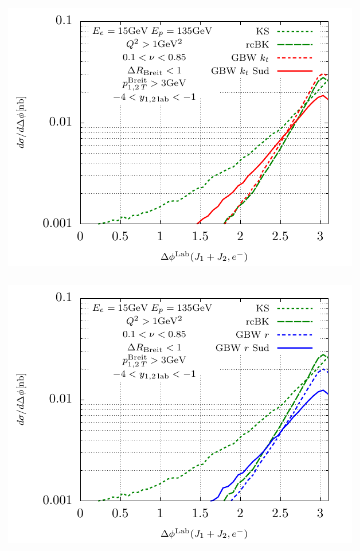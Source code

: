 \documentclass[12pt]{article}
\numberwithin{equation}{section}
\numberwithin{table}{section}
\numberwithin{figure}{section}
\begin{document}
\begin{figure}[p]
	\begin{subfigure}{0.5\textwidth}
		\includegraphics[width=\textwidth]{plots/plotGBW2Lab}
	\end{subfigure}
	\begin{subfigure}{0.5\textwidth}
		\includegraphics[width=\textwidth]{plots/plotGBW3Lab}
	\end{subfigure}


\end{figure}
\end{document}

